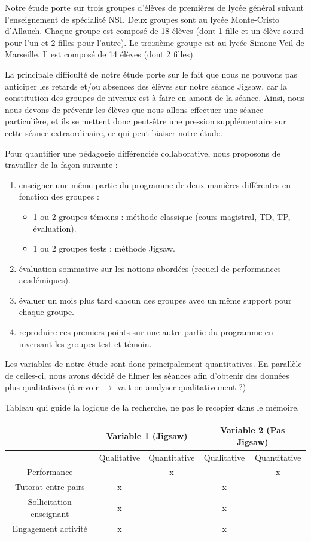 
Notre étude porte sur trois groupes d'élèves de premières de lycée général suivant l'enseignement de spécialité NSI.
Deux groupes sont au lycée Monte-Cristo d'Allauch. Chaque groupe est composé de 18 élèves (dont 1 fille et un élève sourd pour l'un et 2 filles pour l'autre).
Le troisième groupe est au lycée Simone Veil de Marseille. Il est composé de 14 élèves (dont 2 filles).

La principale difficulté de notre étude porte sur le fait que nous ne pouvons pas anticiper les retards et/ou absences des élèves sur notre séance Jigsaw, car la constitution des groupes de niveaux est à faire en amont de la séance. Ainsi, nous nous devons de prévenir les élèves que nous allons effectuer une séance particulière, et ils se mettent donc peut-être une pression supplémentaire sur cette séance extraordinaire, ce qui peut biaiser notre étude.

Pour quantifier une pédagogie différenciée collaborative, nous proposons de travailler de la façon suivante :
\begin{enumerate}
	\item enseigner une même partie du programme de deux manières différentes en fonction des groupes :
	\begin{itemize}
		\item 1 ou 2 groupes témoins : méthode classique (cours magistral, TD, TP, évaluation).
		\item 1 ou 2 groupes tests : méthode Jigsaw.
	\end{itemize}
	\item évaluation sommative sur les notions abordées (recueil de performances académiques).
	\item évaluer un mois plus tard chacun des groupes avec un même support pour chaque groupe.
	\item reproduire ces premiers points sur une autre partie du programme en inversant les groupes test et témoin.
\end{enumerate}

Les variables de notre étude sont donc principalement quantitatives. En parallèle de celles-ci, nous avons décidé de filmer les séances afin d'obtenir des données plus qualitatives (à revoir $\rightarrow$ va-t-on analyser qualitativement ?)

Tableau qui guide la logique de la recherche, ne pas le recopier dans le mémoire.

\begin{center}
\begin{tabular}{|c|c|c|c|c|}
	\hline
	& \multicolumn{2}{|c|}{Variable 1 (Jigsaw)} & \multicolumn{2}{|c|}{Variable 2 (Pas Jigsaw)}\\
	\hline
	& Qualitative & Quantitative & Qualitative & Quantitative\\
	\hline
	Performance &  & x &  & x\\
	\hline
	Tutorat entre pairs & x &  & x & \\
	\hline
	Sollicitation enseignant & x &  & x & \\
	\hline
	Engagement activité & x &  & x & \\
	\hline
\end{tabular}
\end{center}

